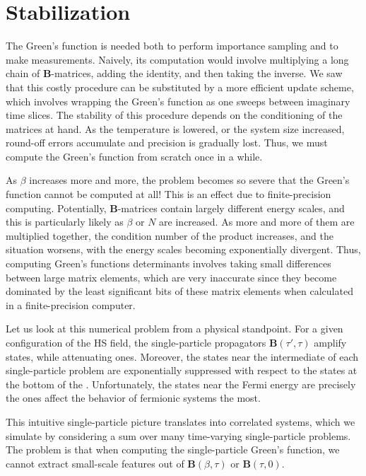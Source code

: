 \section{Stabilization}
\label{subsec:stabilization}

The Green's function is needed both to perform importance sampling and to make measurements.
Naively, its computation would involve multiplying a long chain of $\bm B$-matrices, adding the identity, and then taking the inverse.
We saw that this costly procedure can be substituted by a more efficient update scheme, which involves wrapping the Green's function as one sweeps between imaginary time slices.
The stability of this procedure depends on the conditioning of the matrices at hand.
As the temperature is lowered, or the system size increased, round-off errors accumulate and precision is gradually lost.
Thus, we must compute the Green's function from scratch  once in a while.

As $\beta$ increases more and more, the problem becomes so severe that the Green's function cannot be computed at all!
This is an effect due to finite-precision  computing.
Potentially, $\bm B$-matrices contain largely different energy scales, and this is particularly likely as $\beta$ or $N$ are increased.
As more and more of them are multiplied together, the condition number of the product increases, and the situation worsens, with the energy scales becoming exponentially divergent.
Thus, computing Green's functions determinants involves taking small differences between large matrix elements, which are very inaccurate since they become dominated by the least significant bits of these matrix elements when calculated in a finite-precision computer.

Let us look at this numerical problem from a physical standpoint.
For a given configuration of the HS field, the single-particle propagators $\bm B ( \tau', \tau)$ amplify  states, while attenuating  ones.
Moreover, the states near the intermediate  of each single-particle problem are exponentially suppressed with respect to the states at the bottom of the .
Unfortunately, the states near the Fermi energy are precisely the ones affect the behavior of fermionic systems the most.

This intuitive single-particle picture translates into correlated systems, which we simulate by considering a sum over many time-varying single-particle problems.
The problem is that when computing the single-particle Green's function, we cannot extract small-scale features out of $\bm B ( \beta, \tau)$ or $\bm B ( \tau, 0 )$.

